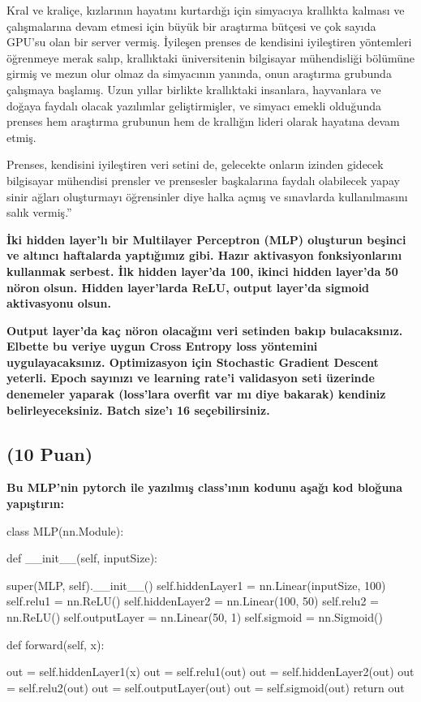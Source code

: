 \documentclass[11pt]{article}
\begin{document}
Kral ve kraliçe, kızlarının hayatını kurtardığı için simyacıya krallıkta kalması ve çalışmalarına devam etmesi için büyük bir araştırma bütçesi ve çok sayıda GPU'su olan bir server vermiş. İyileşen prenses de kendisini iyileştiren yöntemleri öğrenmeye merak salıp, krallıktaki üniversitenin bilgisayar mühendisliği bölümüne girmiş ve mezun olur olmaz da simyacının yanında, onun araştırma grubunda çalışmaya başlamış. Uzun yıllar birlikte krallıktaki insanlara, hayvanlara ve doğaya faydalı olacak yazılımlar geliştirmişler, ve simyacı emekli olduğunda prenses hem araştırma grubunun hem de krallığın lideri olarak hayatına devam etmiş.

Prenses, kendisini iyileştiren veri setini de, gelecekte onların izinden gidecek bilgisayar mühendisi prensler ve prensesler başkalarına faydalı olabilecek yapay sinir ağları oluşturmayı öğrensinler diye halka açmış ve sınavlarda kullanılmasını salık vermiş.''

\textbf{İki hidden layer'lı bir Multilayer Perceptron (MLP) oluşturun beşinci ve altıncı haftalarda yaptığımız gibi. Hazır aktivasyon fonksiyonlarını kullanmak serbest. İlk hidden layer'da 100, ikinci hidden layer'da 50 nöron olsun. Hidden layer'larda ReLU, output layer'da sigmoid aktivasyonu olsun.}

\textbf{Output layer'da kaç nöron olacağını veri setinden bakıp bulacaksınız. Elbette bu veriye uygun Cross Entropy loss yöntemini uygulayacaksınız. Optimizasyon için Stochastic Gradient Descent yeterli. Epoch sayınızı ve learning rate'i validasyon seti üzerinde denemeler yaparak (loss'lara overfit var mı diye bakarak) kendiniz belirleyeceksiniz. Batch size'ı 16 seçebilirsiniz.}

\subsection{(10 Puan)} \textbf{Bu MLP'nin pytorch ile yazılmış class'ının kodunu aşağı kod bloğuna yapıştırın:}

\begin{python}
class MLP(nn.Module):

    def __init__(self, inputSize):

        super(MLP, self).__init__()
        self.hiddenLayer1 = nn.Linear(inputSize, 100)
        self.relu1 = nn.ReLU()
        self.hiddenLayer2 = nn.Linear(100, 50)
        self.relu2 = nn.ReLU()
        self.outputLayer = nn.Linear(50, 1)
        self.sigmoid = nn.Sigmoid()

    def forward(self, x):

        out = self.hiddenLayer1(x)
        out = self.relu1(out)
        out = self.hiddenLayer2(out)
        out = self.relu2(out)
        out = self.outputLayer(out)
        out = self.sigmoid(out)
        return out

\end{python}
\end{document}
